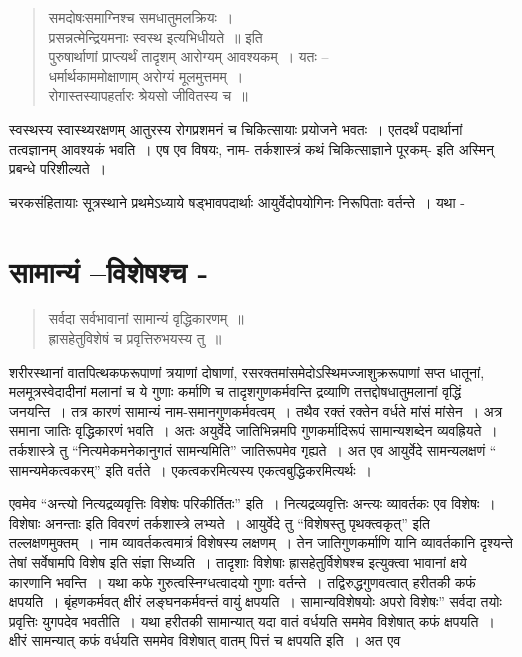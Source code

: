 {\begin{verse}
समदोषःसमाग्निश्च समधातुमलक्रियः~। \\
प्रसन्नत्मेन्द्रियमनाः स्वस्थ इत्यभिधीयते~॥ इति\\
पुरुषार्थाणां प्राप्त्यर्थं तादृशम् आरोग्यम् आवश्यकम्~। यतः –\\
धर्मार्थकाममोक्षाणाम् अरोग्यं मूलमुत्तमम्~। \\
रोगास्तस्यापहर्तारः श्रेयसो जीवितस्य च~॥ 
\end{verse}
स्वस्थस्य स्वास्थ्यरक्षणम् आतुरस्य रोगप्रशमनं च चिकित्सायाः प्रयोजने भवतः~। एतदर्थं पदार्थानां तत्वज्ञानम् आवश्यकं भवति~। एष एव विषयः, नाम- तर्कशास्त्रं कथं चिकित्साज्ञाने पूरकम्- इति अस्मिन् प्रबन्धे परिशील्यते~। 

चरकसंहितायाः सूत्रस्थाने प्रथमेऽध्याये षड्भावपदार्थाः आयुर्वेदोपयोगिनः निरूपिताः वर्तन्ते~। यथा -

\section*{सामान्यं –विशेषश्च -}

\begin{verse}
सर्वदा सर्वभावानां सामान्यं वृद्धिकारणम्~॥\\
ह्रासहेतुविशेषं च प्रवृत्तिरुभयस्य तु~॥
\end{verse}

शरीरस्थानां वातपित्थकफरूपाणां त्रयाणां दोषाणां, रसरक्तमांसमेदोऽस्थिमज्जाशुक्र\-रूपाणां सप्त धातूनां, मलमूत्रस्वेदादीनां मलानां च ये गुणाः कर्माणि च तादृशगुणकर्मवन्ति द्रव्याणि तत्तद्दोषधातुमलानां वृद्धिं जनयन्ति~। तत्र कारणं सामान्यं नाम-समानगुणकर्मवत्वम्~। तथैव रक्तं रक्तेन वर्धते मांसं मांसेन~। अत्र समाना जातिः वृद्धिकारणं भवति~। अतः अयुर्वेदे जातिभिन्नमपि गुणकर्मादिरूपं सामान्यशब्देन व्यवह्रियते~। तर्कशास्त्रे तु “नित्यमेकमनेकानुगतं सामन्यमिति” जातिरूपमेव गृह्यते~। अत एव आयुर्वेदे सामन्यलक्षणं “ सामन्यमेकत्वकरम्” इति वर्तते~। एकत्वकरमित्यस्य एकत्वबुद्धिकरमित्यर्थः~। 

एवमेव “अन्त्यो नित्यद्रव्यवृत्तिः विशेषः परिकीर्तितः” इति~। नित्यद्रव्यवृत्तिः अन्त्यः व्यावर्तकः एव विशेषः~। विशेषाः अनन्ताः इति विवरणं तर्कशास्त्रे लभ्यते~। आयुर्वेदे तु “विशेषस्तु पृथक्त्वकृत्” इति तल्लक्षणमुक्तम्~। नाम व्यावर्तकत्वमात्रं विशेषस्य लक्षणम्~। तेन जातिगुणकर्माणि यानि व्यावर्तकानि दृश्यन्ते तेषां सर्वेषामपि विशेष इति संज्ञा सिध्यति~। तादृशाः विशेषाः ह्रासहेतुर्विशेषश्च इत्युक्त्वा भावानां क्षये कारणानि भवन्ति~। यथा कफे गुरुत्वस्निग्धत्वादयो गुणाः वर्तन्ते~। तद्विरुद्धगुणवत्वात् हरीतकी कफं क्षपयति~। बृंहणकर्मवत् क्षीरं लङ्घनकर्मवन्तं वायुं क्षपयति~। सामान्यविशेषयोः अपरो विशेषः” सर्वदा तयोः प्रवृत्तिः युगपदेव भवतीति~। यथा हरीतकी सामान्यात् यदा वातं वर्धयति सममेव विशेषात् कफं क्षपयति~। क्षीरं सामन्यात् कफं वर्धयति सममेव विशेषात् वातम् पित्तं च क्षपयति इति~। अत एव

}
